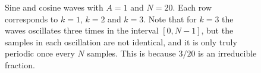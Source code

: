 \begin{figure}[t]
{{
		}
	}
	\caption{Sine and cosine waves with $A=1$ and $N=20$. Each row corresponds to $k=1$, $k=2$ and $k=3$. Note that for $k=3$ the waves oscillates three times in the interval $\left[0,N-1\right]$, but the samples in each oscillation are not identical, and it is only truly periodic once every $N$ samples. This is because $3/20$ is an irreducible fraction. }
	\label{fig:contsignal}
\end{figure}

